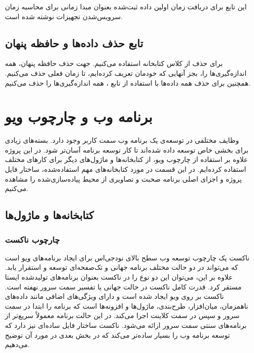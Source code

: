 این تابع برای دریافت زمان اولین داده ثبت‌شده بعنوان مبدا زمانی برای محاسبه زمان سرویس‌شدن تجهیزات نوشته شده است.

\subsection{تابع حذف داده‌ها و حافظه پنهان}

برای حذف از کلاس  کتابخانه استفاده می‌کنیم. جهت حذف حافظه پنهان، همه اندازه‌گیری‌ها را، بجز آنهایی که خودمان تعریف کرده‌ایم، تا زمان فعلی حذف می‌کنیم. همچنین برای حذف همه داده‌ها با استفاده از تابع ، همه اندازه‌گیری‌ها را حذف می‌کنیم.

\section{برنامه وب و چارچوب ویو}

وظایف مختلفی در توسعه‌ی یک برنامه وب سمت کاربر وجود دارد. بسته‌های زیادی برای بخشی خاص توسعه داده شده‌اند تا کار توسعه برنامه آسان‌تر شود. در این پروژه علاوه بر استفاده از چارچوب ویو، از کتابخانه‌ها و ماژول‌های دیگر برای کارهای مختلف استفاده کرده‌ایم. در این قسمت در مورد کتابخانه‌های مهم استفاده‌شده، ساختار فایل پروژه و اجزای اصلی برنامه صحبت و تصاویری از محیط پیاده‌سازی‌شده را مشاهده می‌کنیم.

\subsection{کتابخانه‌ها و ماژول‌ها}

\subsubsection{چارچوب ناکست}

ناکست یک چارچوب توسعه وب سطح بالای نودجی‌اس برای ایجاد برنامه‌های ویو است که می‌تواند در دو حالت مختلف برنامه جهانی و تک‌صفحه‌ای توسعه و استقرار یابد. علاوه بر این، می‌توان این دو نوع را در ناکست بعنوان برنامه‌های تولیدشده ایستا مستقر کرد. قدرت کامل ناکست در حالت جهانی یا تفسیر سمت سرور نهفته است. ناکست بر روی ویو ایجاد شده است و دارای ویژگی‌های اضافی مانند داده‌های ناهمزمان، میان‌افزار، طرح‌بندی، ماژول‌ها و افزونه‌ها است که برنامه را ابتدا در سمت سرور و سپس در سمت کلاینت اجرا می‌کند. در این حالت برنامه معمولاً سریع‌تر از برنامه‌های سنتی سمت سرور ارائه می‌شود\cite{kok2020hands}. ناکست ساختار فایل ساده‌ای نیز دارد که توسعه برنامه وب را بسیار ساده‌تر می‌کند که در بخش بعدی در مورد آن توضیح می‌دهیم.


